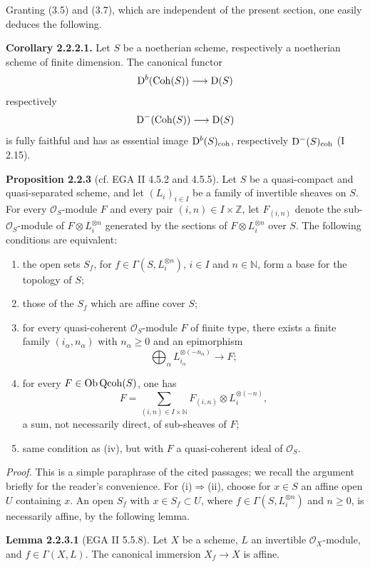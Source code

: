 \documentclass[11pt]{article}
\begin{document}
Granting (3.5) and (3.7), which are independent of the present section, one easily deduces the following.

\textbf{Corollary 2.2.2.1.} Let $S$ be a noetherian scheme, respectively a noetherian scheme of finite dimension. The canonical functor
\[
\mathrm D^b(\operatorname{Coh}(S))\longrightarrow \mathrm D(S)
\]
respectively
\[
\mathrm D^{-}(\operatorname{Coh}(S))\longrightarrow \mathrm D(S)
\]
is fully faithful and has as essential image $\mathrm D^b(S)_{\mathrm{coh}}$, respectively $\mathrm D^{-}(S)_{\mathrm{coh}}$ (I 2.15).

\textbf{Proposition 2.2.3} (cf. EGA II 4.5.2 and 4.5.5). Let $S$ be a quasi-compact and quasi-separated scheme, and let $(L_i)_{i\in I}$ be a family of invertible sheaves on $S$. For every $\mathcal O_S$-module $F$ and every pair $(i,n)\in I\times\mathbb Z$, let $F_{(i,n)}$ denote the sub-$\mathcal O_S$-module of $F\otimes L_i^{\otimes n}$ generated by the sections of $F\otimes L_i^{\otimes n}$ over $S$. The following conditions are equivalent:
\begin{enumerate}[label=(\roman*)]
\item the open sets $S_f$, for $f\in\Gamma(S,L_i^{\otimes n})$, $i\in I$ and $n\in\mathbb N$, form a base for the topology of $S$;
\item those of the $S_f$ which are affine cover $S$;
\item for every quasi-coherent $\mathcal O_S$-module $F$ of finite type, there exists a finite family $(i_\alpha,n_\alpha)$ with $n_\alpha\ge0$ and an epimorphism
\[
\bigoplus_\alpha L_{i_\alpha}^{\otimes(-n_\alpha)}\longrightarrow F;
\]
\item for every $F\in\operatorname{Ob}\operatorname{Qcoh}(S)$, one has
\[
F=\sum_{(i,n)\in I\times\mathbb N}F_{(i,n)}\otimes L_i^{\otimes(-n)},
\]
a sum, not necessarily direct, of sub-sheaves of $F$;
\item same condition as (iv), but with $F$ a quasi-coherent ideal of $\mathcal O_S$.
\end{enumerate}

\emph{Proof.} This is a simple paraphrase of the cited passages; we recall the argument briefly for the reader's convenience. For (i)$\Rightarrow$(ii), choose for $x\in S$ an affine open $U$ containing $x$. An open $S_f$ with $x\in S_f\subset U$, where $f\in\Gamma(S,L_i^{\otimes n})$ and $n\ge0$, is necessarily affine, by the following lemma.

\textbf{Lemma 2.2.3.1} (EGA II 5.5.8). Let $X$ be a scheme, $L$ an invertible $\mathcal O_X$-module, and $f\in\Gamma(X,L)$. The canonical immersion $X_f\to X$ is affine.
\end{document}
